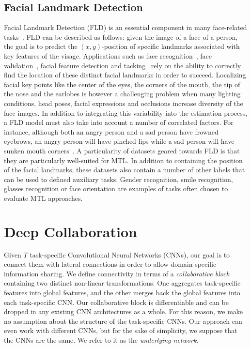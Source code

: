\documentclass[runningheads]{llncs}
\newcommand{\citep}{\cite}
\begin{document}
\subsection{Facial Landmark Detection}
\label{ssec:related-work-fld}

Facial Landmark Detection (FLD) is an essential component in many face-related tasks~\citep{sun2013deep}\citep{zhang2016joint}\citep{jourabloo2016large}\citep{baltruvsaitis2016openface}. FLD can be described as follows: given the image of a face of a person, the goal is to predict the $(x,y)$-position of specific landmarks associated with key features of the visage. Applications such as face recognition~\citep{ding2015robust}, face validation~\citep{taigman2014deepface}, facial feature detection and tacking~\citep{zhang2014improving} rely on the ability to correctly find the location of these distinct facial landmarks in order to succeed. Localizing facial key points like the center of the eyes, the corners of the mouth, the tip of the nose and the earlobes is however a challenging problem when many lighting conditions, head poses, facial expressions and occlusions increase diversity of the face images. In addition to integrating this variability into the estimation process, a FLD model must also take into account a number of correlated factors. For instance, although both an angry person and a sad person have frowned eyebrows, an angry person will have pinched lips while a sad person will have sunken mouth corners~\citep{fabian2016emotionet}. A particularity of datasets geared towards FLD is that they are particularly well-suited for MTL. In addition to containing the position of the facial landmarks, these datasets also contain a number of other labels that can be used to defined auxiliary tasks. Gender recognition, smile recognition, glasses recognition or face orientation are examples of tasks often chosen to evaluate MTL approaches.

\section{Deep Collaboration}
\label{sec:deep-collaboration}

Given $T$ task-specific Convolutional Neural Networks (CNNs), our goal is to connect them with lateral connections in order to allow domain-specific information sharing. We define connectivity in terms of a \textit{collaborative block} containing two distinct non-linear transformations. One aggregates task-specific features into global features, and the other merges back the global features into each task-specific CNN. Our collaborative block is differentiable and can be dropped in any existing CNN architectures as a whole. For this reason, we make no assumption about the structure of the task-specific CNNs. Our approach can even work with different CNNs, but for the sake of simplicity, we suppose that the CNNs are the same. We refer to it as the \textit{underlying network}.
\end{document}
